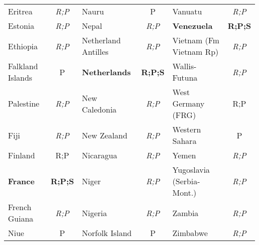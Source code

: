 \documentclass[12pt,twoside,a4paper,notitlepage]{article}
\begin{document}
\begin{table}
\begin{tabular}{|l|c|l|c|l|c|}
   Eritrea &  {\it R;P} &      Nauru &          P &    Vanuatu &  {\it R;P} \\

   Estonia &  {\it R;P} &      Nepal &  {\it R;P} & \bf Venezuela &  {\bf R;P;S} \\

  Ethiopia &  {\it R;P} & Netherland Antilles &  {\it R;P} &  Vietnam (Fm Vietnam Rp) &  {\it R;P} \\

Falkland Islands &          P & \bf Netherlands &  {\bf R;P;S} & Wallis-Futuna &  {\it R;P} \\

 Palestine & {\it R;P}  & New Caledonia &  {\it R;P} & West Germany (FRG) &  {R;P} \\

      Fiji &  {\it R;P} & New Zealand &  {\it R;P} & Western Sahara &          P \\

   Finland &  {R;P} &  Nicaragua &  {\it R;P} &      Yemen &  {\it R;P} \\

\bf  France &  {\bf R;P;S} &      Niger &  {\it R;P} & Yugoslavia (Serbia-Mont.) &  {\it R;P} \\

French Guiana & {\it R;P}  &  Nigeria &  {\it R;P} &     Zambia &  {\it R;P} \\

Niue & P & Norfolk Island  & P &   Zimbabwe &  {\it R;P} \\
\hline
\end{tabular}    
\end{table}
\end{document}
